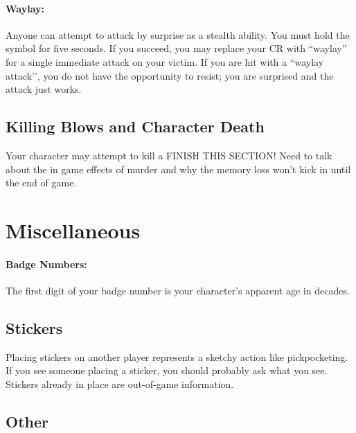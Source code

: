 \documentclass[sheet]{GL2020}
\begin{document}
\paragraph{Waylay:} Anyone can attempt to attack by surprise as a stealth ability. You must hold the symbol for five seconds.  If you succeed, you may replace your CR with ``waylay'' for a single immediate attack on your victim. If you are hit with a ``waylay attack’’, you do not have the opportunity to resist; you are surprised and the attack just works.

\subsection{Killing Blows and Character Death}

Your character may attempt to kill a FINISH THIS SECTION! Need to talk about the in game effects of murder and why the memory loss won't kick in until the end of game.

\section{Miscellaneous}

\paragraph{Badge Numbers:} The first digit of your badge number is your character's apparent age in decades.

%
%
%

\subsection{Stickers}
Placing stickers on another player represents a sketchy action like pickpocketing. If you see someone placing a sticker, you should probably ask what you see. Stickers already in place are out-of-game information.

\subsection{Other}
\end{document}
